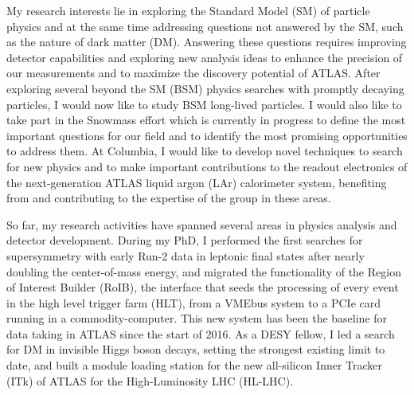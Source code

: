 \documentclass[a4paper]{article}
\begin{document}
\thispagestyle{fancy} 
 \lfoot{} \rfoot{\bf \thepage} \cfoot{}

\fontsize{11}{14}
\selectfont

My research interests lie in exploring the Standard Model (SM) of particle physics and at the same time addressing questions not answered by the SM, such as the nature of dark matter (DM). Answering these questions requires improving detector capabilities and exploring new analysis ideas to enhance the precision of our measurements and to maximize the discovery potential of ATLAS. After exploring several beyond the SM (BSM) physics searches with promptly decaying particles, I would now like to study BSM long-lived particles. I would also like to take part in the Snowmass effort which is currently in progress to define the most important questions for our field and to identify the most promising opportunities to address them. At Columbia, I would like to develop novel techniques to search for new physics and to make important contributions to the readout electronics of the next-generation ATLAS liquid argon (LAr) calorimeter system, benefiting from and contributing to the expertise of the group in these areas.

\bigskip

So far, my research activities have spanned several areas in physics analysis and detector development. During my PhD, I performed the first searches for supersymmetry with early Run-2 data in leptonic final states after nearly doubling the center-of-mass energy, and migrated the functionality of the Region of Interest Builder (RoIB), the interface that seeds the processing of every event in the high level trigger farm (HLT), from a VMEbus system to a PCIe card running in a commodity-computer. This new system has been the baseline for data taking in ATLAS since the start of 2016. As a DESY fellow, I led a search for DM in invisible Higgs boson decays, setting the strongest existing limit to date, and built a module loading station for the new all-silicon Inner Tracker (ITk) of ATLAS for the High-Luminosity LHC (HL-LHC).

\bigskip
\end{document}
